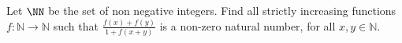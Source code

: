 Let $\NN$ be the set of non negative integers. Find all strictly increasing functions $f : \mathbb{N} \to \mathbb{N} $ such that $\frac {f(x) + f(y)}{1 + f(x + y)}$ is a non-zero natural number, for all $x, y\in\mathbb{N}$.
